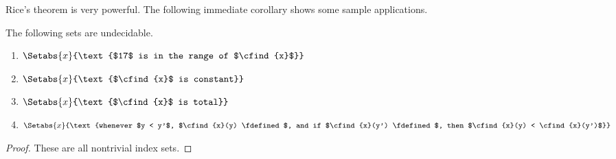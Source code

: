 \documentclass[../../../include/open-logic-section]{subfiles}
\begin{document}
Rice's theorem is very powerful. The following immediate corollary
shows some sample applications.
\begin{cor}
The following sets are undecidable.
\begin{enumerate}
\item $\Setabs{x}{\text{$17$ is in the range of $\cfind{x}$}}$
\item $\Setabs{x}{\text{$\cfind{x}$ is constant}}$
\item $\Setabs{x}{\text{$\cfind{x}$ is total}}$
\item $\Setabs{x}{\text{whenever $y < y'$, $\cfind{x}(y) \fdefined$, and
    if $\cfind{x}(y') \fdefined$, then $\cfind{x}(y) < \cfind{x}(y')$}}$
\end{enumerate}
\end{cor}

\begin{proof}
  These are all nontrivial index sets.
\end{proof}
\end{document}

